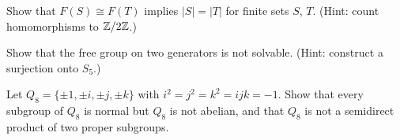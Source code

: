 \begin{exercise}\label{groups:exercise-free-group-rank}
Show that $F(S) \cong F(T)$ implies $|S| = |T|$ for finite sets $S$, $T$. (Hint: count
homomorphisms to $\mathbb{Z}/2\mathbb{Z}$.)
\end{exercise}

\begin{exercise}\label{groups:exercise-free-group-nonabelian}
Show that the free group on two generators is not solvable. (Hint: construct a
surjection onto $S_5$.)
\end{exercise}

\begin{exercise}\label{groups:exercise-q8}
Let $Q_8 = \{\pm 1, \pm i, \pm j, \pm k\}$ with $i^2 = j^2 = k^2 = ijk = -1$. Show that
every subgroup of $Q_8$ is normal but $Q_8$ is not abelian, and that $Q_8$ is not a
semidirect product of two proper subgroups.
\end{exercise}
